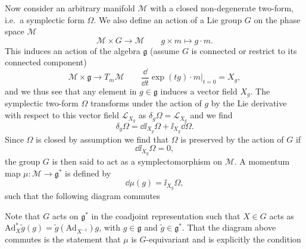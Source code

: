 Now consider an arbitrary manifold $\mathcal{M}$ with a closed non-degenerate two-form, i.e.\ a symplectic form $\Omega$. We also define an action of a Lie group $G$ on the phase space $\mathcal{M}$
\begin{equation}
    \mathcal{M}\times G\to \mathcal{M} \qquad g \times m\mapsto g\cdot m.
\end{equation}
This induces an action of the algebra $\mathfrak{g}$ (assume $G$ is connected or restrict to its connected component)
\begin{equation}
    \mathcal{M}\times \mathfrak{g} \to T_m \mathcal{M}\qquad \frac{\dd }{\dd t}\exp (tg)\cdot m|_{t=0} =X_g,
\end{equation}
and we thus see that any element in $g\in\mathfrak{g}$ induces a vector field $X_g$. The symplectic two-form $\Omega$ transforms under the action of $g$ by the Lie derivative with respect to this vector field $\mathcal{L}_{X_g}$ as $\delta_g \Omega = \mathcal{L}_{X_g}$ and we find
\begin{equation}
    \delta_g \Omega = \dd \ii_{X_g} \Omega + \ii_{X_g}\dd\Omega.
\end{equation}
Since $\Omega$ is closed by assumption we find that $\Omega$ is preserved by the action of $G$ if 
\begin{equation}
    \dd \ii_{X_g}\Omega = 0,
\end{equation}
the group $G$ is then said to act as a symplectomorphism on $\mathcal{M}$. A momentum map $\mu: \mathcal{M}\to\mathfrak{g}^*$ is defined by
\begin{equation}
    \dd \mu (g) = \ii_{X_g}\Omega,
\end{equation}
such that the following diagram commutes 
\begin{center}
\end{center}
Note that $G$ acts on $\mathfrak{g}^*$ in the coadjoint representation such that $X\in G$ acts as $\text{Ad}_X^*\tilde{g}(g)=\tilde{g}(\text{Ad}_{X^{-1}})g$, with $g\in \mathfrak{g}$ and $\tilde{g}\in \mathfrak{g}^*$. That the diagram above commutes is the statement that $\mu$ is $G$-equivariant and is explicitly the condition 
